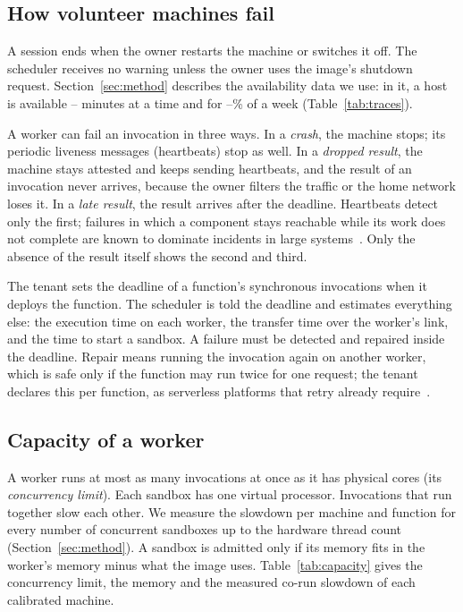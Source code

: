 \subsection{How volunteer machines fail}
\label{sec:bg-fail}

A session ends when the owner restarts the machine or switches it off. The scheduler receives no warning unless the
owner uses the image's shutdown request. Section~\ref{sec:method} describes the availability data we use: in it, a
host is available \VTraceIntervalMedianLoMin--\VTraceIntervalMedianHiMin{} minutes at a time and for
\VTraceAvailableLoPct--\VTraceAvailableHiPct\% of a week (Table~\ref{tab:traces}).

A worker can fail an invocation in three ways. In a \emph{crash}, the machine stops; its periodic liveness messages
(heartbeats) stop as well. In a \emph{dropped result}, the machine stays attested and keeps sending heartbeats, and
the result of an invocation never arrives, because the owner filters the traffic or the home network loses it.
In a \emph{late result}, the result arrives after the deadline. Heartbeats detect only the first; failures in which a
component stays reachable while its work does not complete are known to dominate incidents in large
systems~\cite{huang2017gray}. Only the absence of the result itself shows the second and third.

The tenant sets the deadline of a function's synchronous invocations when it deploys the function. The scheduler is
told the deadline and estimates everything else: the execution time on each worker, the transfer time over the
worker's link, and the time to start a sandbox. A failure must be detected and repaired inside the deadline. Repair
means running the invocation again on another worker, which is safe only if the function may run twice for one
request; the tenant declares this per function, as serverless platforms that retry already
require~\cite{awslambdaretries}.

\subsection{Capacity of a worker}
\label{sec:bg-capacity}

A worker runs at most as many invocations at once as it has physical cores (its \emph{concurrency limit}). Each
sandbox has one virtual processor. Invocations that run together slow each other. We measure the slowdown per machine
and function for every number of concurrent sandboxes up to the hardware thread count
(Section~\ref{sec:method}). A sandbox is admitted only if its memory fits in the worker's memory minus what the image
uses. Table~\ref{tab:capacity} gives the concurrency limit, the memory and the measured co-run slowdown of each
calibrated machine.

